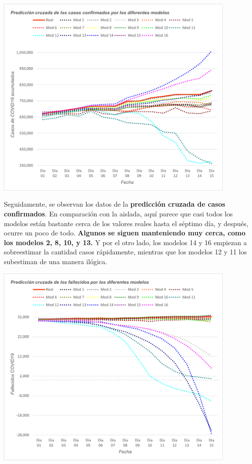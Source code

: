 \documentclass[12pt,a4paper, xcolor=table]{article}
\begin{document}
            \begin{center}
                \centering
                \includegraphics[width=450px]{img/pred_c_conf_ES.png}
            \end{center}

            Seguidamente, se observan los datos de la \textbf{predicción cruzada de casos confirmados}. En comparación con la aislada, aquí parece que casi todos los modelos están bastante cerca de los valores reales hasta el séptimo día, y después, ocurre un poco de todo. \textbf{Algunos se siguen manteniendo muy cerca, como los modelos 2, 8, 10, y 13.} Y por el otro lado, los modelos 14 y 16 empiezan a sobreestimar la cantidad casos rápidamente, mientras que los modelos 12 y 11 los subestiman de una manera ilógica.

            \begin{center}
                \centering
                \includegraphics[width=450px]{img/pred_c_fall_ES.png}
            \end{center}
\end{document}
